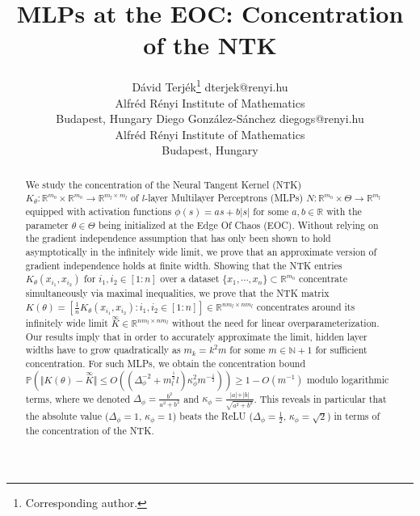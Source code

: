 \documentclass[twoside,11pt]{article}
\newcommand{\R}{\mathbb{R}}
\newcommand{\N}{\mathbb{N}}
\newcommand{\Prob}{\mathbb{P}}
\newcommand{\limiting}[1]{\overset{\scriptscriptstyle\infty}{#1}}
\begin{document}
\title{MLPs at the EOC: Concentration of the NTK}

\author{
  \name D\'avid Terj\'ek\thanks{Corresponding author.}
  \email dterjek@renyi.hu \\
  \addr Alfr\'ed R\'enyi Institute of Mathematics \\ Budapest, Hungary
  \AND
  \name Diego Gonz\'alez-S\'anchez 
  \email diegogs@renyi.hu \\
  \addr Alfr\'ed R\'enyi Institute of Mathematics \\ Budapest, Hungary
}

\editor{}

\maketitle

\begin{abstract}%
We study the concentration of the Neural Tangent Kernel (NTK) $K_\theta : \R^{m_0} \times \R^{m_0} \to \R^{m_l \times m_l}$ of $l$-layer Multilayer Perceptrons (MLPs) $N : \R^{m_0} \times \Theta \to \R^{m_l}$ equipped with activation functions $\phi(s) = a s + b \vert s \vert$ for some $a,b \in \R$ with the parameter $\theta \in \Theta$ being initialized at the Edge Of Chaos (EOC). Without relying on the gradient independence assumption that has only been shown to hold asymptotically in the infinitely wide limit, we prove that an approximate version of gradient independence holds at finite width. Showing that the NTK entries $K_\theta(x_{i_1},x_{i_2})$ for $i_1,i_2 \in [1:n]$ over a dataset $\{x_1,\cdots,x_n\} \subset \R^{m_0}$ concentrate simultaneously via maximal inequalities, we prove that the NTK matrix $K(\theta) = [\frac{1}{n} K_\theta(x_{i_1},x_{i_2}) : i_1,i_2 \in [1:n]] \in \R^{nm_l \times nm_l}$ concentrates around its infinitely wide limit $\limiting{K} \in \R^{nm_l \times nm_l}$ without the need for linear overparameterization. Our results imply that in order to accurately approximate the limit, hidden layer widths have to grow quadratically as $m_k = k^2 m$ for some $m \in \N+1$ for sufficient concentration. For such MLPs, we obtain the concentration bound $\Prob( \Vert K(\theta) - \limiting{K} \Vert \leq O((\Delta_\phi^{-2} + m_l^{\frac{1}{2}} l) \kappa_\phi^2 m^{-\frac{1}{2}})) \geq 1-O(m^{-1})$ modulo logarithmic terms, where we denoted $\Delta_\phi = \frac{b^2}{a^2+b^2}$ and $\kappa_\phi = \frac{\vert a \vert + \vert b \vert}{\sqrt{a^2 + b^2}}$. This reveals in particular that the absolute value ($\Delta_\phi=1$, $\kappa_\phi=1$) beats the ReLU ($\Delta_\phi=\frac{1}{2}$, $\kappa_\phi=\sqrt{2}$) in terms of the concentration of the NTK.
\end{abstract}
\end{document}
